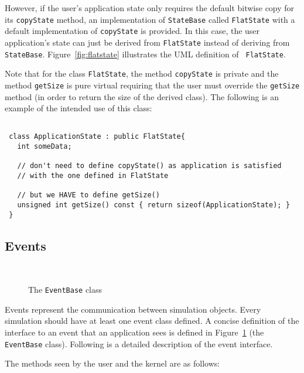 \documentclass[11pt]{article}
\begin{document}
However, if the user's application state only requires the default bitwise
copy for its {\tt copyState} method, an implementation of {\tt StateBase}
called {\tt FlatState} with a default implementation of {\tt copyState} is
provided.  In this case, the user application's state can just be derived
from {\tt FlatState} instead of deriving from {\tt StateBase}.
Figure~\ref{fig:flatstate} illustrates the UML definition of {\tt
FlatState}.  

Note that for the class {\tt FlatState}, the method {\tt copyState} is
private and the method {\tt getSize} is pure virtual requiring that the
user must override the {\tt getSize} method (in order to return the size
of the derived class). The following is an example of the intended use of
this class:

\begin{verbatim}

 class ApplicationState : public FlatState{
   int someData;

   // don't need to define copyState() as application is satisfied 
   // with the one defined in FlatState

   // but we HAVE to define getSize()
   unsigned int getSize() const { return sizeof(ApplicationState); }
 }
\end{verbatim}

\subsection{Events}\label{events}

\begin{figure}[th]
\begin{center}
\ 
\end{center}
\caption{The {\tt EventBase} class}\label{fig:eventBase}
\end{figure}

Events represent the communication between simulation objects.  Every
simulation should have at least one event class defined.  A concise
definition of the interface to an event that an application sees is
defined in Figure~\ref{fig:eventBase} (the {\tt EventBase} class).
Following is a detailed description of the event interface. 


The methods seen by the user and the kernel are as follows:
\end{document}
